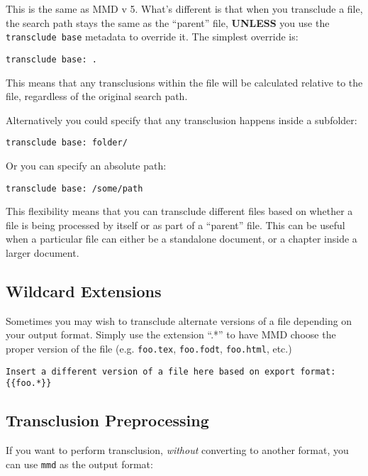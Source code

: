 This is the same as \gls{MMD} v 5. What's different is that when you transclude a
file, the search path stays the same as the ``parent'' file, \textbf{UNLESS} you use
the \texttt{transclude base} metadata to override it. The simplest override is:

\begin{verbatim}
transclude base: .
\end{verbatim}

This means that any transclusions within the file will be calculated relative
to the file, regardless of the original search path.

Alternatively you could specify that any transclusion happens inside a
subfolder:

\begin{verbatim}
transclude base: folder/
\end{verbatim}

Or you can specify an absolute path:

\begin{verbatim}
transclude base: /some/path
\end{verbatim}

This flexibility means that you can transclude different files based on
whether a file is being processed by itself or as part of a ``parent'' file.
This can be useful when a particular file can either be a standalone document,
or a chapter inside a larger document.

\subsection{Wildcard Extensions}
\label{wildcardextensions}

Sometimes you may wish to transclude alternate versions of a file depending on your output format. Simply use the extension ``.*'' to have \gls{MMD} choose the proper version of the file (e.g. \texttt{foo.tex}, \texttt{foo.fodt}, \texttt{foo.html}, etc.)

\begin{verbatim}
Insert a different version of a file here based on export format:
{{foo.*}}
\end{verbatim}

\subsection{Transclusion Preprocessing}
\label{transclusionpreprocessing}

If you want to perform transclusion, \emph{without} converting to another format, you can use \texttt{mmd} as the output format:

